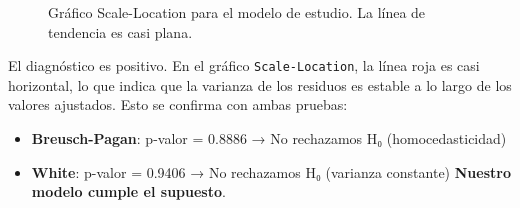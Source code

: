 \documentclass[
  letterpaper,
  DIV=11,
  numbers=noendperiod]{scrreprt}
\providecommand{\tightlist}{%
  \setlength{\itemsep}{0pt}\setlength{\parskip}{0pt}}
\begin{document}
\begin{tcolorbox}
\begin{figure}[H]
{}

\caption{\label{fig-homocedasticidad-ok}Gráfico Scale-Location para el
modelo de estudio. La línea de tendencia es casi plana.}

\end{figure}%

El diagnóstico es positivo. En el gráfico \texttt{Scale-Location}, la
línea roja es casi horizontal, lo que indica que la varianza de los
residuos es estable a lo largo de los valores ajustados. Esto se
confirma con ambas pruebas:

\begin{itemize}
\tightlist
\item
  \textbf{Breusch-Pagan}: p-valor = 0.8886 → No rechazamos H₀
  (homocedasticidad)
\item
  \textbf{White}: p-valor = 0.9406 → No rechazamos H₀ (varianza
  constante) \textbf{Nuestro modelo cumple el supuesto}.
\end{itemize}

\end{tcolorbox}
\end{document}
